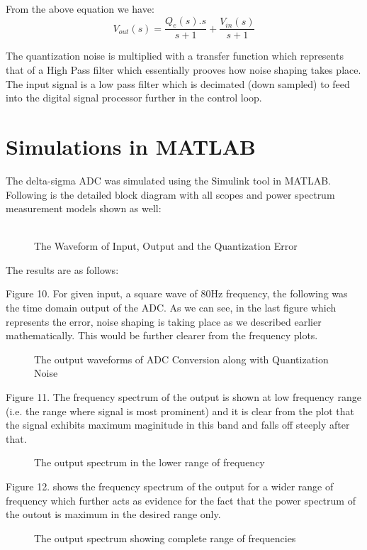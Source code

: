 \documentclass[colorlinks=true,pdfstartview=FitV,linkcolor=blue,
            citecolor=red,urlcolor=magenta]{ligodoc}
\begin{document}
From the above equation we have:
\begin{equation}
V_{out}(s)=\frac{Q_{e}(s).s}{s+1} + \frac{V_{in}(s)}{s+1}
\end{equation}

The quantization noise is multiplied with a transfer function which represents that of a High Pass filter which essentially prooves how noise shaping takes place. The input signal is a low pass filter which is decimated (down sampled) to feed into the digital signal processor further in the control loop.

\section{Simulations in MATLAB}
The delta-sigma ADC was simulated using the Simulink tool in MATLAB.
Following is the detailed block diagram with all scopes and power spectrum measurement models shown as well: \\ \\
\begin{figure}[htbp]
 
  \centering
  
  \caption{The Waveform of Input, Output and the Quantization Error}
 
\end{figure}
The results are as follows:

Figure 10. For given input, a square wave of 80Hz frequency, the following was the time domain output of the ADC. As we can see, in the last figure which represents the error, noise shaping is taking place as we described earlier mathematically. This would be further clearer from the frequency plots. 
\begin{figure}[htbp]
 
  \centering
  
  \caption{The output waveforms of ADC Conversion along with Quantization Noise}
 
\end{figure}
Figure 11. The frequency spectrum of the output is shown at low frequency range (i.e. the range where signal is most prominent) and it is clear from the plot that the signal exhibits maximum maginitude in this band and falls off steeply after that. 
\begin{figure}[htbp]
 
  \centering
  
  \caption{The output spectrum in the lower range of frequency}
 
\end{figure}
Figure 12. shows the frequency spectrum of the output for a wider range of frequency which further acts as evidence for the fact that the power spectrum of the outout is maximum in the desired range only. 
\begin{figure}[htbp]
 
  \centering
  
  \caption{The output spectrum showing complete range of frequencies}
 
\end{figure}
\end{document}
